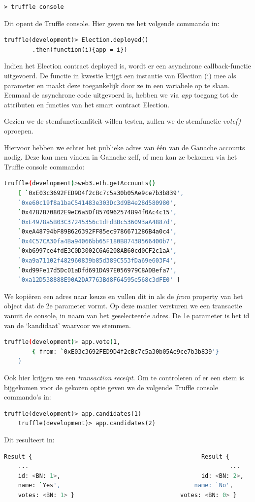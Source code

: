 	\begin{lstlisting}[numbers=none]
	> truffle console
	\end{lstlisting}
	
	Dit opent de Truffle console. 
	Hier geven we het volgende commando in:

	\begin{lstlisting}[numbers=none]
	truffle(development)> Election.deployed()
		.then(function(i){app = i})
	\end{lstlisting}
	
	Indien het Election contract deployed is, wordt er een asynchrone callback-functie uitgevoerd.  De functie in kwestie krijgt  een instantie van Election (i) mee als parameter en maakt deze toegankelijk door ze in een variabele op te slaan. Eenmaal de asynchrone code uitgevoerd is, hebben we via \textit{app} toegang tot de attributen en functies van het smart contract Election.
	
	Gezien we de stemfunctionaliteit willen testen, zullen we de stemfunctie \textit{vote()} oproepen.
	
	Hiervoor hebben we echter het publieke adres van één van de Ganache accounts nodig. Deze kan men vinden in Ganache zelf, of men kan ze bekomen via het Truffle console commando:
	\begin{lstlisting}[numbers=none,language=bash]
	truffle(development)>web3.eth.getAccounts()
	[ `0xE03c3692FED9D4f2cBc7c5a30b05Ae9ce7b3b839',
	`0xe60c19f8a1baC541483e303Dc3d9B4e28d580980',
	`0x47B7B70802E9eC6a5Df8570962574894f0Ac4c15',
	`0xE4978a5B03C37245356c1dFdBBc536093aA4887d',
	`0xeA48794bF89B626392FF85ec9786671286B4a0c4',
	`0x4C57CA30fa4Ba94066bb65F180B87438566400b7',
	`0xb6997ce4fdE3C0D3002C6A6208AB60cd0CF2c1aA',
	`0xa9a71102f482960839b85d389C553fDa69e603F4',
	`0xd99Fe17d5Dc01aDfd691DA97E056979C8ADBefa7',
	`0xa12D538888E90A2DA7763Bd8F64595e568c3dFE0' ]
	\end{lstlisting}
	
	We kopiëren een adres naar keuze en vullen dit in als de \textit{from} property van het object dat de 2e parameter vormt. Op deze manier versturen we een transactie vanuit de console, in naam van het geselecteerde adres. De 1e parameter is het id van de `kandidaat' waarvoor we stemmen.
	\begin{lstlisting}[numbers=none,language=bash]
	truffle(development)> app.vote(1, 
		{ from: `0xE03c3692FED9D4f2cBc7c5a30b05Ae9ce7b3b839'}
	)
	\end{lstlisting}
	
	Ook hier krijgen we een \textit{transaction receipt}.
	Om te controleren of er een stem is bijgekomen voor de gekozen optie geven we de volgende Truffle console commando's in:
	\begin{lstlisting}[numbers=none]
	truffle(development)> app.candidates(1)
	truffle(development)> app.candidates(2)
	\end{lstlisting}
	Dit resulteert in:
	\begin{lstlisting}[numbers=none,language=bash]
	Result {												Result {
	...															...
	id: <BN: 1>,										id: <BN: 2>,
	name: `Yes',									  name: `No',
	votes: <BN: 1> }							  votes: <BN: 0> }
	\end{lstlisting}
	
